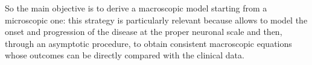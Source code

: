 So the main objective is to derive a macroscopic model starting from a microscopic one: this strategy is particularly relevant because allows to model the onset and progression of the disease at the proper neuronal scale and then, through an asymptotic procedure, to obtain consistent macroscopic equations whose outcomes can be directly compared with the clinical data.
